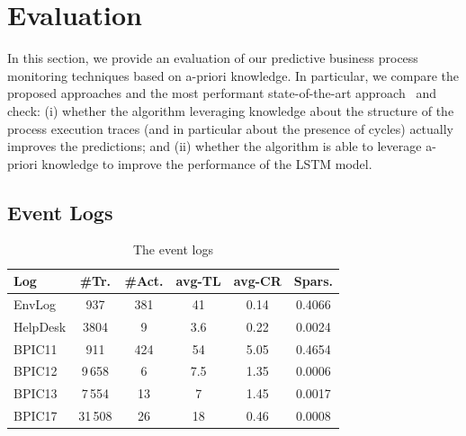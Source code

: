 
\section{Evaluation} %
\label{sec:evaluation}

In this section, we provide an evaluation of our predictive business process monitoring techniques based on a-priori knowledge. In particular, we compare the proposed approaches and the most performant state-of-the-art approach~\cite{niek96732} and check: (i) whether the \nocycle algorithm leveraging knowledge about the structure of the process execution traces (and in particular about the presence of cycles) actually improves the predictions; and (ii) whether the \protrack algorithm is able to leverage a-priori knowledge to improve the performance of the LSTM model.

\subsection{Event Logs}
\label{ssec:datasets}

\begin{table}[t]
	\centering
	 \begin{scriptsize}
	\begin{tabular}{l|c|c|c|c|c}
		\toprule
		\textbf{Log} &\textbf{\#Tr.}  & \textbf{\#Act.}  & \textbf{avg-TL} & \textbf{avg-CR}  & \textbf{Spars.}\\
		\midrule
		EnvLog      & 937    & 381   & 41      & 0.14 & 0.4066 \\
		HelpDesk    & 3804   & 9     & 3.6       & 0.22 & 0.0024 \\
		BPIC11       & 911    & 424   & 54       & 5.05 & 0.4654 \\
		BPIC12       & 9\,658   & 6     & 7.5     & 1.35 & 0.0006 \\
		BPIC13       & 7\,554   & 13    & 7       & 1.45 & 0.0017 \\
		BPIC17       & 31\,508  & 26    & 18     & 0.46 & 0.0008 \\
		\bottomrule
	\end{tabular}
	\end{scriptsize}
	\caption{The event logs}
	\label{table:dataset}
\end{table}

